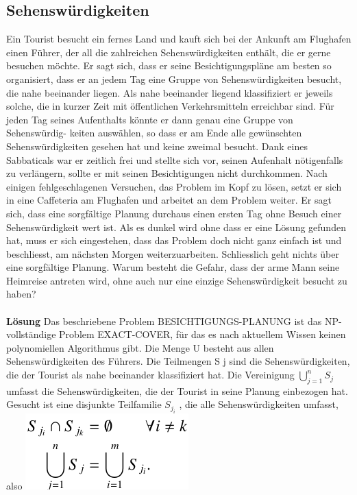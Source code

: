 \subsection{Sehenswürdigkeiten}
Ein Tourist besucht ein fernes Land und kauft sich bei der Ankunft am Flughafen einen Führer, der all die zahlreichen Sehenswürdigkeiten enthält, die er gerne besuchen möchte. Er sagt sich, dass er seine Besichtigungspläne am besten so organisiert, dass er an jedem Tag eine Gruppe von Sehenswürdigkeiten besucht, die nahe beeinander liegen. Als nahe beeinander liegend klassifiziert er jeweils solche, die in kurzer Zeit mit öffentlichen Verkehrsmitteln erreichbar sind. Für jeden Tag seines Aufenthalts könnte er dann genau eine Gruppe von Sehenswürdig- keiten auswählen, so dass er am Ende alle gewünschten Sehenswürdigkeiten gesehen hat und keine zweimal besucht. Dank eines Sabbaticals war er zeitlich frei und stellte sich vor, seinen Aufenhalt nötigenfalls zu verlängern, sollte er mit seinen Besichtigungen nicht durchkommen. Nach einigen fehlgeschlagenen Versuchen, das Problem im Kopf zu lösen, setzt er sich in eine Caffeteria am Flughafen und arbeitet an dem Problem weiter. Er sagt sich, dass eine sorgfältige Planung durchaus einen ersten Tag ohne Besuch einer Sehenswürdigkeit wert ist. Als es dunkel wird ohne dass er eine Lösung gefunden hat, muss er sich eingestehen, dass das Problem doch nicht ganz einfach ist und beschliesst, am nächsten Morgen weiterzuarbeiten. Schliesslich geht nichts über eine sorgfältige Planung. Warum besteht die Gefahr, dass der arme Mann seine Heimreise antreten wird, ohne auch nur eine einzige Sehenswürdigkeit besucht zu haben?\\
\\
\textbf{Lösung}
Das beschriebene Problem BESICHTIGUNGS-PLANUNG ist das NP-vollständige Problem EXACT-COVER, für das es nach aktuellem Wissen keinen polynomiellen Algorithmus gibt. Die Menge U besteht aus allen Sehenswürdigkeiten des Führers. Die Teilmengen S j sind die Sehenswürdigkeiten, die der Tourist als nahe beeinander klassifiziert hat. Die Vereinigung $\bigcup_{j=1}^n S_j$ umfasst die Sehenswürdigkeiten, die der Tourist in seine Planung einbezogen hat. Gesucht ist eine disjunkte Teilfamilie $S_{j_i}$ , die alle Sehenswürdigkeiten umfasst, also
\includegraphics[width=\columnwidth/2]{img/sehenswuerdigkeiten.png}